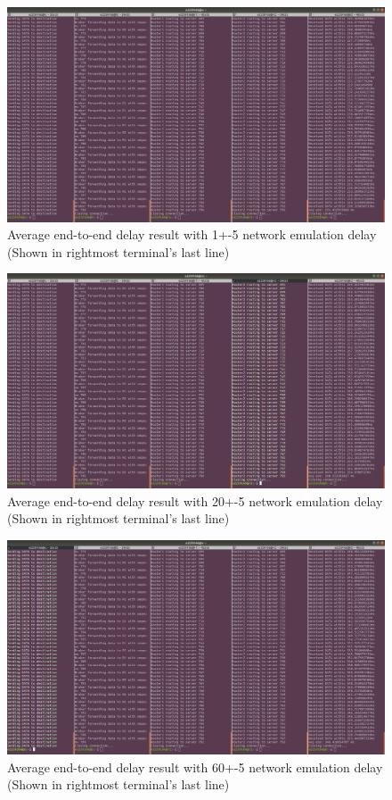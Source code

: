 \documentclass[conference]{IEEEtran}
\begin{document}
\begin{figure}
    \centering
    \includegraphics[scale=0.12]{1delay_result.png}
    \caption{Average end-to-end delay result with 1+-5 network emulation delay (Shown in rightmost terminal's last line)}
\end{figure}

\begin{figure}
    \centering
    \includegraphics[scale=0.12]{20delay_result.png}
    \caption{Average end-to-end delay result with 20+-5 network emulation delay (Shown in rightmost terminal's last line)}
\end{figure}

\begin{figure}
    \centering
    \includegraphics[scale=0.12]{60delay_result.png}
    \caption{Average end-to-end delay result with 60+-5 network emulation delay (Shown in rightmost terminal's last line)}
\end{figure}
\end{document}
